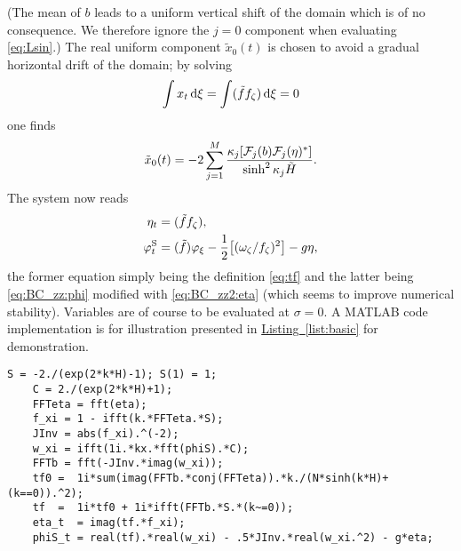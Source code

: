 \documentclass[a4paper,12pt]{article}
\newcommand{\mr}{\mathrm}
\newcommand{\mc}{\mathcal}
\renewcommand{\S}{^\mr{S}}
\renewcommand{\_}[1]{_\mr{#1}}
\let\Re\relax
\let\Im\relax
\DeclareMathOperator\Re{Re}
\DeclareMathOperator\Im{Im}
\newcommand{\lref}[2]{\href{#2}{#1~\ref*{#2}}}%
\newcommand{\zz}{\zeta}
\newcommand{\xx}{\xi}
\newcommand{\yy}{\sigma}
\newcommand{\kk}{\kappa}
\newcommand{\zmap}{f}
\newcommand{\ww}{\omega}
\newcommand{\Hzz}{\tilde H}
\newcommand{\hzz}{\eta}
\newcommand{\FF}{\mc F}
\newcommand{\tf}{\tilde \zmap}
\begin{document}
(The mean of $b$ leads to a uniform vertical shift of the domain which is of no consequence. We therefore ignore the $j=0$ component when evaluating \eqref{eq:Lsin}.)
The real uniform component $\tilde x_{0}(t)$ is chosen to avoid a gradual horizontal drift of the domain; 
by solving 
\[\int x_t\,\mr d\xx=\int\Re(\tf \zmap_\zz) \,\mr d \xx = 0\]
one finds
\begin{equation}
\tilde x_{0}(t) = -2\sum_{j=1}^M \frac{\kk_j \Im[\FF_j(b)\FF_j(\eta)^*]}{\sinh^2\kk_j\Hzz}.
\label{eq:tx0}
\end{equation}
The system now reads
\begin{subequations}
\begin{align}
\eta_t&= \Im(\tf \zmap_\zz), \\
\varphi\S_t &= \Re(\tf)\varphi_\xx  - \frac12\Re \big[(\ww_\zz/\zmap_\zz)^2\big]  - g \hzz,
\end{align}%
\label{eq:BC_zz2}%
\end{subequations}%
the former equation simply being the definition \eqref{eq:tf} and the latter being \eqref{eq:BC_zz:phi} modified with \eqref{eq:BC_zz2:eta} (which seems to improve numerical stability).
Variables are of course to be evaluated at $\yy=0$.
A MATLAB code implementation is for illustration presented in \lref{Listing}{list:basic} for demonstration.



%
\begin{lstlisting}[basicstyle=\ttfamily\small,label=list:basic,caption=Core implementation in MATLAB (without anti-aliasing)]
	S = -2./(exp(2*k*H)-1); S(1) = 1;
	C = 2./(exp(2*k*H)+1);
	FFTeta = fft(eta);
	f_xi = 1 - ifft(k.*FFTeta.*S);
	JInv = abs(f_xi).^(-2);
	w_xi = ifft(1i.*kx.*fft(phiS).*C);
	FFTb = fft(-JInv.*imag(w_xi));
	tf0 =  1i*sum(imag(FFTb.*conj(FFTeta)).*k./(N*sinh(k*H)+(k==0)).^2);
	tf  =  1i*tf0 + 1i*ifft(FFTb.*S.*(k~=0));
	eta_t  = imag(tf.*f_xi);
	phiS_t = real(tf).*real(w_xi) - .5*JInv.*real(w_xi.^2) - g*eta;
\end{lstlisting}
\end{document}
